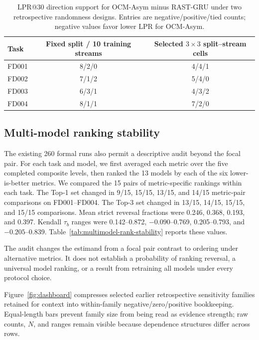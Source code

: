 \documentclass[preprint,12pt,numbers,sort&compress]{elsarticle}
\begin{document}
\begin{table}[!t]
\centering
\scriptsize
\setlength{\tabcolsep}{4pt}
\caption{LPR@30 direction support for OCM-Asym minus RAST-GRU under two retrospective randomness designs. Entries are negative/positive/tied counts; negative values favor lower LPR for OCM-Asym.}
\label{tab:lpr-directions}
\begin{tabular}{@{}lcc@{}}
\toprule
Task & Fixed split / 10 training streams & Selected $3\times3$ split--stream cells \\
\midrule
FD001 & 8/2/0 & 4/4/1 \\
FD002 & 7/1/2 & 5/4/0 \\
FD003 & 6/3/1 & 4/3/2 \\
FD004 & 8/1/1 & 7/2/0 \\
\bottomrule
\end{tabular}
\end{table}
\FloatBarrier

\subsection{Multi-model ranking stability}

The existing 260 formal runs also permit a descriptive audit beyond the focal pair. For each task and model, we first averaged each metric over the five completed composite levels, then ranked the 13 models by each of the six lower-is-better metrics. We compared the 15 pairs of metric-specific rankings within each task. The Top-1 set changed in 9/15, 15/15, 13/15, and 14/15 metric-pair comparisons on FD001--FD004. The Top-3 set changed in 13/15, 14/15, 15/15, and 15/15 comparisons. Mean strict reversal fractions were 0.246, 0.368, 0.193, and 0.397. Kendall $\tau_b$ ranges were 0.142--0.872, $-0.090$--0.769, 0.205--0.793, and $-0.205$--0.839. Table~\ref{tab:multimodel-rank-stability} reports these values.

The audit changes the estimand from a focal pair contrast to ordering under alternative metrics. It does not establish a probability of ranking reversal, a universal model ranking, or a result from retraining all models under every protocol choice.



Figure~\ref{fig:dashboard} compresses selected earlier retrospective sensitivity families retained for context into within-family negative/zero/positive bookkeeping. Equal-length bars prevent family size from being read as evidence strength; raw counts, $N$, and ranges remain visible because dependence structures differ across rows.
\end{document}

